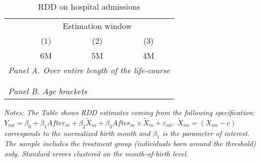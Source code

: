 
\begin{table}[H] \centering 
	\begin{threeparttable} \centering \caption{RDD on hospital admissions}\label{tab_mlch: revision_RDD_hopsital2_total_app}
		{\def\sym#1{\ifmmode^{#1}\else\(^{#1}\)\fi} 
			\begin{tabular}{l*{3}{c}}
				\toprule 
				& \multicolumn{3}{c}{Estimation window} \\ 
				\cmidrule(lr){2-4}
				&\multicolumn{1}{c}{(1)}&\multicolumn{1}{c}{(2)}&\multicolumn{1}{c}{(3)}\\
				&\multicolumn{1}{c}{6M}&\multicolumn{1}{c}{5M}&\multicolumn{1}{c}{4M}\\
				\midrule
				\multicolumn{4}{l}{\emph{Panel A. Over entire length of the life-course}} \\
				 \\ \\
				\multicolumn{4}{l}{\emph{Panel B. Age brackets}} \\
				    
				\bottomrule 
		\end{tabular}}
		\begin{tablenotes} 
			\item \scriptsize \emph{Notes: The Table shows RDD estimates coming from the following specification: $Y_{mt} = \beta_0 + \beta_1 After_{m} + \beta_2 \tilde X_{m} + \beta_3 After_{m} \times \tilde X_{m} + \varepsilon_{mt}$. $\tilde X_{im}=(X_{im}-c)$ corresponds to the normalized birth month and $\beta_1$ is the parameter of interest. The sample includes the treatment group (individuals born around the threshold) only. Standard errors clustered on the month-of-birth level.} 
		\end{tablenotes} 
	\end{threeparttable} 
\end{table}

